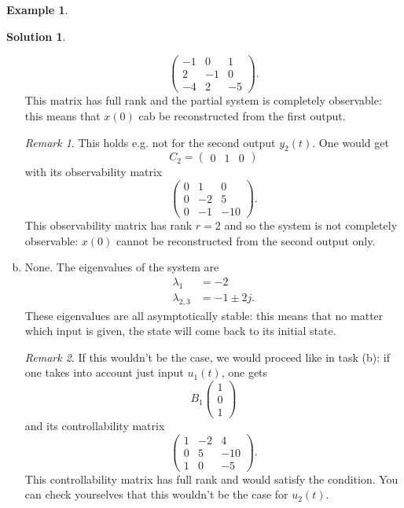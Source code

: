 \documentclass[a4paper,12 pt]{article}
\numberwithin{equation}{section}
\theoremstyle{definition}
\newtheorem{bsp}{Example}
\theoremstyle{remark}
\newtheorem*{bmk}{Remark}
\theoremstyle{definition}
\newtheorem*{lsg}{Solution}
\theoremstyle{definition}
\theoremstyle{definition}
\theoremstyle{remark}
\begin{document}
\begin{bsp}
\begin{lsg}
\begin{enumerate}[(a)]
\begin{equation*}
\begin{pmatrix}
-1&0&1\\
2&-1&0\\
-4&2&-5
\end{pmatrix}.
\end{equation*}
This matrix has full rank and the partial system is completely observable: this means that $x(0)$ cab be reconstructed from the first output.
\begin{bmk}
This holds e.g. not for the second output $y_2(t)$. One would get
\begin{equation*}
C_2=\begin{pmatrix} 0&1&0\end{pmatrix}
\end{equation*}
with its observability matrix
\begin{equation*}
\begin{pmatrix}
0&1&0\\
0&-2&5\\
0&-1&-10
\end{pmatrix}.
\end{equation*}
This observability matrix has rank $r=2$ and so the system is not completely observable: $x(0)$ cannot be reconstructed from the second output only.
\end{bmk}
\item None. The eigenvalues of the system are
\begin{equation*}
\begin{split}
\lambda_1 &=-2\\
\lambda_{2,3}&=-1\pm 2j.
\end{split}
\end{equation*}
These eigenvalues are all asymptotically stable: this means that no matter which input is given, the state will come back to its initial state.
\begin{bmk}
If this wouldn't be the case, we would proceed like in task (b): if one takes into account just input $u_1(t)$, one gets
\begin{equation*}
B_1\begin{pmatrix}
1\\
0\\
1
\end{pmatrix}
\end{equation*}
and its controllability matrix
\begin{equation*}
\begin{pmatrix}
1&-2&4\\
0&5&-10\\
1&0&-5
\end{pmatrix}.
\end{equation*}
This controllability matrix has full rank and would satisfy the condition. You can check yourselves that this wouldn't be the case for $u_2(t)$.
\end{bmk}

\end{enumerate}
\end{lsg}
\end{bsp}
\newpage
\end{document}
